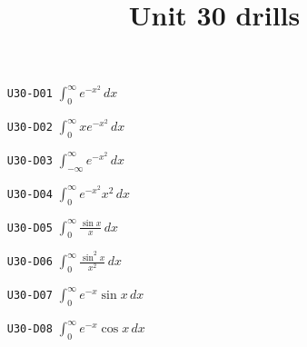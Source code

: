 \title{Unit 30 drills}\maketitle\begin{enumerate}
  \item[\texttt{U30-D01}] $\displaystyle \int_{0}^{\infty}e^{-x^{2}}\,dx$
  \item[\texttt{U30-D02}] $\displaystyle \int_{0}^{\infty}x e^{-x^{2}}\,dx$
  \item[\texttt{U30-D03}] $\displaystyle \int_{-\infty}^{\infty}e^{-x^{2}}\,dx$
  \item[\texttt{U30-D04}] $\displaystyle \int_{0}^{\infty}e^{-x^{2}}x^{2}\,dx$
  \item[\texttt{U30-D05}] $\displaystyle \int_{0}^{\infty}\frac{\sin x}{x}\,dx$
  \item[\texttt{U30-D06}] $\displaystyle \int_{0}^{\infty}\frac{\sin^{2}x}{x^{2}}\,dx$
  \item[\texttt{U30-D07}] $\displaystyle \int_{0}^{\infty}e^{-x}\sin x\,dx$
  \item[\texttt{U30-D08}] $\displaystyle \int_{0}^{\infty}e^{-x}\cos x\,dx$
\end{enumerate}

